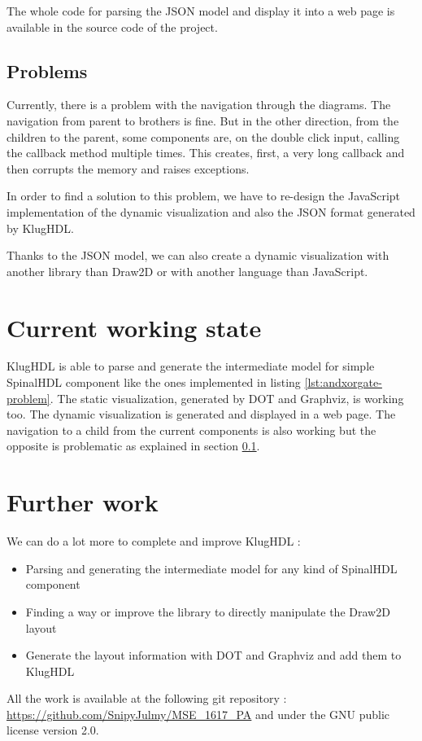 The whole code for parsing the JSON model and display it into a web page is
available in the source code of the project.

\subsection{Problems}
\label{sec:problems}

Currently, there is a problem with the navigation through the diagrams. The
navigation from parent to brothers is fine. But in the other direction, from the
children to the parent, some components are, on the double click input, calling
the callback method multiple times. This creates, first, a very long
callback and then corrupts the memory and raises exceptions.

In order to find a solution to this problem, we have to re-design the JavaScript
implementation of the dynamic visualization and also the JSON format generated
by KlugHDL.

Thanks to the JSON model, we can also create a dynamic visualization with
another library than Draw2D or with another language than JavaScript.

\section{Current working state}
\label{sec:current-working-state}

KlugHDL is able to parse and generate the intermediate model for simple
SpinalHDL component like the ones implemented in listing
\ref{lst:andxorgate-problem}. The static visualization, generated by DOT and
Graphviz, is working too. The dynamic visualization is generated and displayed
in a web page. The navigation to a child from the current components is also
working but the opposite is problematic as explained in section \ref{sec:problems}.

\section{Further work}
\label{sec:further-work}

We can do a lot more to complete and improve KlugHDL :
\begin{itemize}
\item Parsing and generating the intermediate model for any kind of SpinalHDL
  component
\item Finding a way or improve the library to directly manipulate the Draw2D
  layout
\item Generate the layout information with DOT and Graphviz and add them to KlugHDL
\end{itemize}

All the work is available at the following git repository :
\url{https://github.com/SnipyJulmy/MSE_1617_PA} and under the GNU public license version 2.0.


